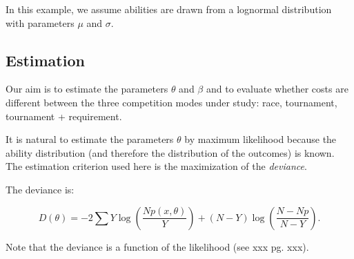 \documentclass[]{article}
\begin{document}
In this example, we assume abilities are drawn from a lognormal
distribution with parameters \(\mu\) and \(\sigma\).

\subsection{Estimation}\label{estimation-1}

Our aim is to estimate the parameters \(\theta\) and \(\beta\) and to
evaluate whether costs are different between the three competition modes
under study: race, tournament, tournament + requirement.

It is natural to estimate the parameters \(\theta\) by maximum
likelihood because the ability distribution (and therefore the
distribution of the outcomes) is known. The estimation criterion used
here is the maximization of the \emph{deviance}.

The deviance is:

\begin{equation}
    D(\theta) = -2 \sum Y \log (\frac{N p(x, \theta)}{Y}) 
        + (N - Y) \log ( \frac{N - N p}{N - Y}).
\end{equation}

Note that the deviance is a function of the likelihood (see xxx pg.
xxx).
\end{document}
